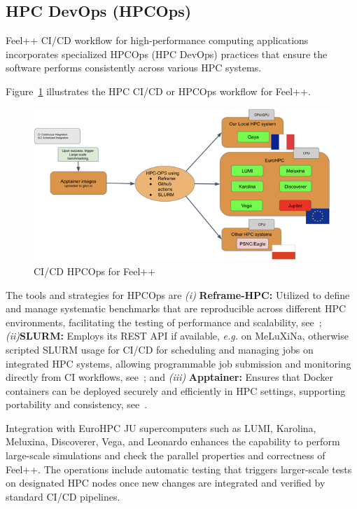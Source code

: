 \documentclass[runningheads]{llncs}
\begin{document}
\subsection{HPC DevOps (HPCOps)}
Feel++ CI/CD workflow for high-performance computing applications incorporates specialized HPCOps (HPC DevOps) practices that ensure the software performs consistently across various HPC systems. 


Figure~\ref{fig:feelpp-hpcops} illustrates the HPC CI/CD or HPCOps workflow for Feel++. 
\begin{figure}
    \centering
    \includegraphics[width=\textwidth]{img-compressed-feelpp-hpcops.png}
    \caption{CI/CD HPCOps for Feel++}
    \label{fig:feelpp-hpcops}
\end{figure}

The tools and strategies for HPCOps are  \textit{(i) }\textbf{Reframe-HPC:} Utilized to define and manage systematic benchmarks that are reproducible across different HPC environments, facilitating the testing of performance and scalability, see~\cite{karakasis_reframe-hpcreframe_2024};
\textit{(ii)}\textbf{SLURM:} Employs its REST API if available, \textit{e.g.} on MeLuXiNa, otherwise scripted SLURM usage for CI/CD for scheduling and managing jobs on integrated HPC systems, allowing programmable job submission and monitoring directly from CI workflows, see~\cite{slurm_development_team_slurm_2024}; and \textit{(iii)} \textbf{Apptainer:} Ensures that Docker containers can be deployed securely and efficiently in HPC settings, supporting portability and consistency, see~\cite{apptainer_contributors_apptainer_2024}.

Integration with EuroHPC JU supercomputers such as LUMI, Karolina, Meluxina, Discoverer, Vega, and Leonardo enhances the capability to perform large-scale simulations and check the parallel properties and correctness of Feel++. The operations include automatic testing that triggers larger-scale tests on designated HPC nodes once new changes are integrated and verified by standard CI/CD pipelines.
\end{document}
